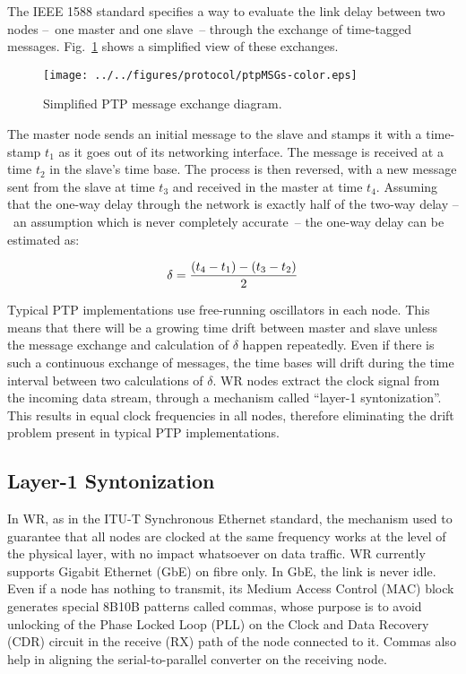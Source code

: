 \documentclass{../JAC2003}
\begin{document}
The IEEE 1588 standard specifies a way to evaluate the link delay
between two nodes --~one master and one slave~-- through the exchange
of time-tagged messages. Fig.~\ref{ptp-fig} shows a simplified view of
these exchanges.

\begin{figure}[htb]
   \centering
   \texttt{[image: ../../figures/protocol/ptpMSGs-color.eps]}
   \caption{Simplified PTP message exchange diagram.}
   \label{ptp-fig}
\end{figure}

The master node sends an initial message to the slave and stamps it with
a time-stamp $t_1$ as it goes out of its networking interface. The
message is received at a time $t_2$ in the slave's time base. The
process is then reversed, with a new message sent from the slave at
time $t_3$ and received in the master at time $t_4$. Assuming that the
one-way delay through the network is exactly half of the two-way delay
--~an assumption which is never completely accurate~-- the one-way
delay can be estimated as:

\begin{equation}\label{ptp-eq}
    \delta={{(t_4 - t_1) - (t_3 - t_2)} \over 2} 
\end{equation}

Typical PTP implementations use free-running oscillators in each
node. This means that there will be a growing time drift between
master and slave unless the message exchange and calculation of
$\delta$ happen repeatedly. Even if there is such a continuous
exchange of messages, the time bases will drift during the time
interval between two calculations of $\delta$. WR nodes extract the
clock signal from the incoming data stream, through a mechanism called
``layer-1 syntonization''. This results in equal clock frequencies in
all nodes, therefore eliminating the drift problem present in typical
PTP implementations.

\subsection{Layer-1 Syntonization}

In WR, as in the ITU-T Synchronous Ethernet standard, the mechanism
used to guarantee that all nodes are clocked at the same frequency
works at the level of the physical layer, with no impact whatsoever on
data traffic. WR currently supports Gigabit Ethernet (GbE) on fibre
only. In GbE, the link is never idle. Even if a node has nothing to
transmit, its Medium Access Control (MAC) block generates special
8B10B patterns called commas, whose purpose is to avoid unlocking of the Phase
Locked Loop (PLL) on the Clock and Data Recovery (CDR) circuit in the
receive (RX) path of the node connected to it. Commas also help in aligning the
serial-to-parallel converter on the receiving node. 
\end{document}
